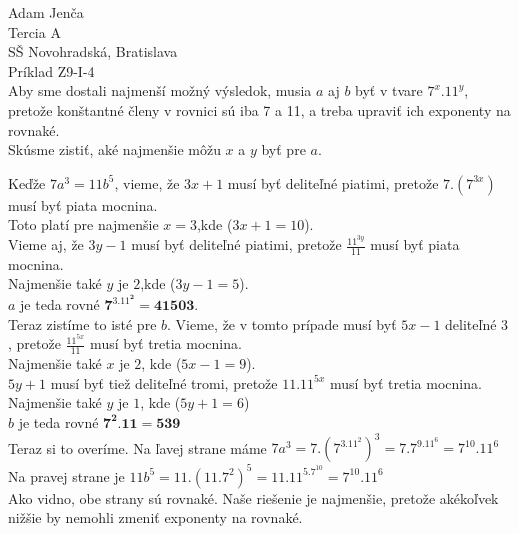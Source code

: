 \documentclass{article}
\begin{document}
\noindent
\large
Adam Jenča\\
Tercia A\\
SŠ Novohradská, Bratislava\\
Príklad Z9-I-4\\
\vskip 10mm \noindent
Aby sme dostali najmenší možný výsledok, musia $a$ aj $b$ byť v tvare
$7^x.11^y$, pretože konštantné členy v rovnici sú iba 7 a 11, a treba upraviť ich exponenty na rovnaké.\\
Skúsme zistiť, aké najmenšie môžu $x$ a $y$ byť pre $a$.

Keďže $7a^3=11b^5$, vieme, že $3x+1$ musí byť deliteľné piatimi, pretože $7.(7^{3x})$ musí byť piata mocnina.\\
Toto platí pre najmenšie $x = 3$,kde    ($3x+1 = 10$).\\
Vieme aj, že $3y-1$ musí byť deliteľné piatimi, pretože $\frac{11^{3y}}{11}$ musí byť piata mocnina.\\
Najmenšie také $y$ je $2$,kde ($3y-1 = 5$).\\
$a$ je teda rovné $\mathbf{7^3.11^2 = 41503}$.\\
Teraz zistíme to isté pre $b$.
Vieme, že v tomto prípade musí byť $5x - 1$ deliteľné 3 , pretože $\frac{11^{5x}}{11}$ musí byť tretia mocnina.\\
Najmenšie také $x$ je $2$, kde ($5x-1 = 9$).\\
$5y+1$ musí byť tiež deliteľné tromi, pretože $11.{11^{5x}}$ musí byť tretia mocnina.\\
Najmenšie také $y$ je $1$, kde ($5y+1 = 6$)\\
$b$ je teda rovné $\mathbf{7^2 . 11 = 539}$\\
Teraz si to overíme.
Na ľavej strane máme $7a^3 = 7.(7^3.11^2)^3=7.7^9.11^{6}=7^{10}.11^{6}$\\
Na pravej strane je  $11b^5 = 11.(11.7^2)^5=11.11^5.7^{10}=7^{10}.11^{6}$\\
Ako vidno, obe strany sú rovnaké. Naše riešenie je najmenšie, pretože akékoľvek nižšie by nemohli zmeniť exponenty na rovnaké.
\end{document}
